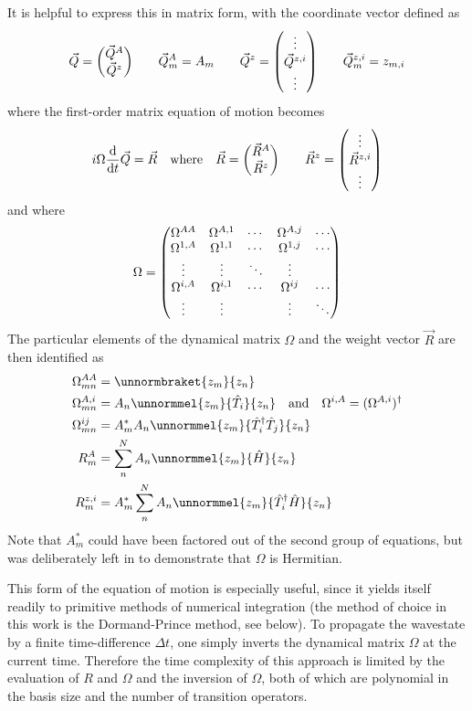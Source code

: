 It is helpful to express this in matrix form, with the coordinate vector defined as
\begin{equation}
\vec{Q}=\mqty(\vec{Q}^A\\\vec{Q}^z) \qquad \vec{Q}^A_m=A_m \qquad \vec{Q}^z=\mqty(\vdots\\\vec{Q}^{z,i}\\\vdots) \qquad \vec{Q}^{z,i}_m=z_{m,i}
\end{equation}
where the first-order matrix equation of motion becomes
\begin{equation}
i\Omega\dv{t}\vec{Q}=\vec{R} \qq{where} \vec{R}=\mqty(\vec{R}^A\\\vec{R}^z) \qquad \vec{R}^z=\mqty(\vdots\\\vec{R}^{z,i}\\\vdots)
\end{equation}
and where
\begin{equation}
\Omega = \mqty(
	\Omega^{AA} & \Omega^{A,1} & \cdots & \Omega^{A,j} & \cdots\\
	\Omega^{1,A} & \Omega^{1,1} & \cdots & \Omega^{1,j} & \cdots\\
	\vdots & \vdots & \ddots & \vdots &\\
	\Omega^{i,A} & \Omega^{i,1} & \cdots & \Omega^{ij} & \cdots\\
	\vdots & \vdots & & \vdots & \ddots
)
\end{equation}
The particular elements of the dynamical matrix $\Omega$ and the weight vector $\vec{R}$ are then identified as
\begin{align}
\Omega^{AA}_{mn} &= \unnormbraket{z_m}{z_n}\\
\Omega^{A,i}_{mn} &= A_n\unnormmel{z_m}{\hat{T}_i}{z_n}\qq{and} \Omega^{i,A}=(\Omega^{A,i})\hc\\
\Omega^{ij}_{mn} &= A_m^*A_n\unnormmel{z_m}{\hat{T}_i\hc \hat{T}_j}{z_n}\\
R^A_m &= \sum_n^N A_n\unnormmel{z_m}{\hat{H}}{z_n}\\
R^{z,i}_m &= A_m^*\sum_n^N A_n \unnormmel{z_m}{\hat{T}_i\hc \hat{H}}{z_n}
\end{align}
Note that $A_m^*$ could have been factored out of the second group of equations, but was deliberately left in to demonstrate that $\Omega$ is Hermitian.

This form of the equation of motion is especially useful, since it yields itself readily to primitive methods of numerical integration (the method of choice in this work is the Dormand-Prince method, see below). To propagate the wavestate by a finite time-difference $\Delta t$, one simply inverts the dynamical matrix $\Omega$ at the current time. Therefore the time complexity of this approach is limited by the evaluation of $R$ and $\Omega$ and the inversion of $\Omega$, both of which are polynomial in the basis size and the number of transition operators.

